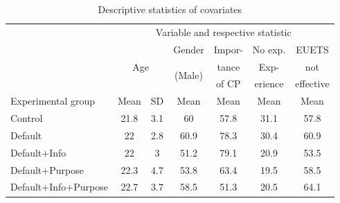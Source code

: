 \documentclass[review, authoryear,12pt]{elsarticle}
\begin{document}
\begin{table}[htbp]
  \centering
  \begin{adjustbox}{max width=\textwidth}
  \caption{Descriptive statistics of covariates}
    \label{tab3}%
    \begin{tabular}{lcccccc}
    \toprule
    \toprule
          & \multicolumn{6}{c}{Variable and respective statistic} \\
\cmidrule{2-7}          & \multicolumn{2}{c}{\multirow{3}[2]{*}{Age}} & Gender & Impor- & No exp. & EUETS \\
          & \multicolumn{2}{c}{} & \multirow{2}[1]{*}{(Male)} & tance & Exp-  & not \\
          & \multicolumn{2}{c}{} &       & of CP & erience & effective \\
\cmidrule{2-7}    Experimental group & Mean  & SD    & Mean    & Mean    & Mean    & Mean  \\
    \midrule
    Control & 21.8  & 3.1     & 60    & 57.8  & 31.1  & 57.8 \\
    Default & 22    & 2.8     & 60.9  & 78.3  & 30.4  & 60.9 \\
    Default+Info & 22    & 3     & 51.2  & 79.1  & 20.9  & 53.5 \\
    Default+Purpose & 22.3  & 4.7     & 53.8  & 63.4  & 19.5  & 58.5 \\
    Default+Info+Purpose & 22.7  & 3.7     & 58.5  & 51.3  & 20.5  & 64.1 \\
    \bottomrule
    \bottomrule
    \end{tabular}%
    \end{adjustbox}
\end{table}%
\end{document}
